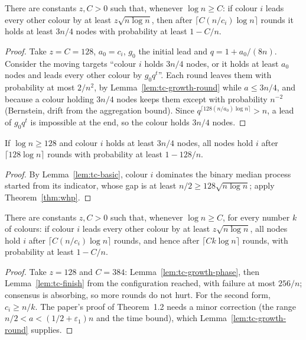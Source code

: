 \begin{lemma}\label{lem:tc-growth-phase}
\leanok{}
There are constants $z,C>0$ such that, whenever $\log n\ge C$: if colour $i$ leads every other
colour by at least $z\sqrt{n\log n}$, then after $\lceil C(n/c_i)\log n\rceil$ rounds it holds at
least $3n/4$ nodes with probability at least $1-C/n$.
\end{lemma}
\begin{proof}\leanok
Take $z=C=128$, $a_0=c_i$, $g_0$ the initial lead and $q=1+a_0/(8n)$. Consider the moving targets
``colour $i$ holds $3n/4$ nodes, or it holds at least $a_0$ nodes and leads every other colour by
$g_0q^t$''. Each round leaves them with probability at most $2/n^2$, by
Lemma~\ref{lem:tc-growth-round} while $a\le3n/4$, and because a colour holding $3n/4$ nodes keeps
them except with probability $n^{-2}$ (Bernstein, drift from the aggregation bound). Since
$q^{\lceil128(n/a_0)\log n\rceil}>n$, a lead of $g_0q^t$ is impossible at the end, so the colour
holds $3n/4$ nodes.
\end{proof}

\begin{lemma}\label{lem:tc-finish}
\leanok{}
If $\log n\ge128$ and colour $i$ holds at least $3n/4$ nodes, all nodes hold $i$ after
$\lceil128\log n\rceil$ rounds with probability at least $1-128/n$.
\end{lemma}
\begin{proof}\leanok
By Lemma~\ref{lem:tc-basic}, colour $i$ dominates the binary median process started from its
indicator, whose gap is at least $n/2\ge128\sqrt{n\log n}$; apply Theorem~\ref{thm:whp}.
\end{proof}

\begin{theorem}\label{thm:tc-plurality}
\leanok{}
There are constants $z,C>0$ such that, whenever $\log n\ge C$, for every number $k$ of colours: if
colour $i$ leads every other colour by at least $z\sqrt{n\log n}$, all nodes hold $i$ after
$\lceil C(n/c_i)\log n\rceil$ rounds, and hence after $\lceil Ck\log n\rceil$ rounds, with
probability at least $1-C/n$.
\end{theorem}
\begin{proof}\leanok
Take $z=128$ and $C=384$: Lemma~\ref{lem:tc-growth-phase}, then Lemma~\ref{lem:tc-finish} from the
configuration reached, with failure at most $256/n$; consensus is absorbing, so more rounds do not
hurt. For the second form, $c_i\ge n/k$. The paper's proof of Theorem~1.2 needs a minor
correction (the range $n/2<a<(1/2+\varepsilon_1)n$ and the time bound), which
Lemma~\ref{lem:tc-growth-round} supplies.
\end{proof}

